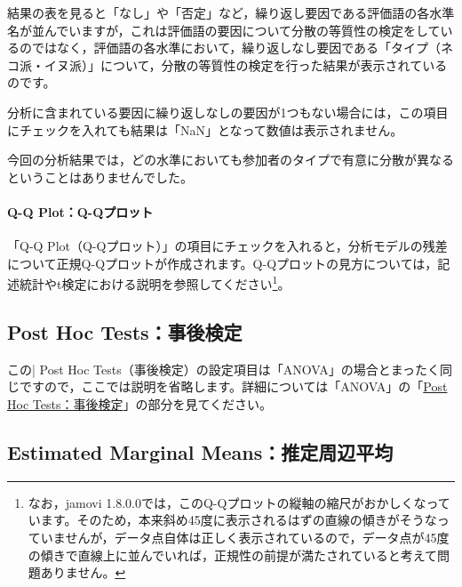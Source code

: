 \documentclass[
  12pt,
  a5jpaper,
  lualatex, ja=standard]{bxjsbook}
\begin{document}
結果の表を見ると「なし」や「否定」など，繰り返し要因である評価語の各水準名が並んでいますが，これは評価語の要因について分散の等質性の検定をしているのではなく，評価語の各水準において，繰り返しなし要因である「タイプ（ネコ派・イヌ派）」について，分散の等質性の検定を行った結果が表示されているのです。

分析に含まれている要因に繰り返しなしの要因が1つもない場合には，この項目にチェックを入れても結果は「NaN」となって数値は表示されません。

今回の分析結果では，どの水準においても参加者のタイプで有意に分散が異なるということはありませんでした。

\hypertarget{q-q-plotq-qux30d7ux30edux30c3ux30c8-2}{%
\paragraph*{Q-Q Plot：Q-Qプロット}\label{q-q-plotq-qux30d7ux30edux30c3ux30c8-2}}

「Q-Q Plot（Q-Qプロット）」の項目にチェックを入れると，分析モデルの残差について正規Q-Qプロットが作成されます。Q-Qプロットの見方については，記述統計やt検定における説明を参照してください\footnote{なお，jamovi 1.8.0.0では，このQ-Qプロットの縦軸の縮尺がおかしくなっています。そのため，本来斜め45度に表示されるはずの直線の傾きがそうなっていませんが，データ点自体は正しく表示されているので，データ点が45度の傾きで直線上に並んでいれば，正規性の前提が満たされていると考えて問題ありません。}。

\hypertarget{sub:ANOVA-rm-posthoc}{%
\subsection{Post Hoc Tests：事後検定}\label{sub:ANOVA-rm-posthoc}}

この\colorbox{bar}{\textcolor{gmoji2}{| Post Hoc Tests}}（事後検定）の設定項目は「ANOVA」の場合とまったく同じですので，ここでは説明を省略します。詳細については「ANOVA」の「\protect\hyperlink{sub:ANOVA-anova-posthoc}{Post Hoc Tests：事後検定}」の部分を見てください。

\hypertarget{sub:ANOVA-rm-marginal}{%
\subsection{Estimated Marginal Means：推定周辺平均}\label{sub:ANOVA-rm-marginal}}
\end{document}
